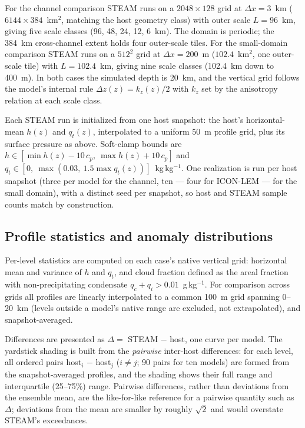 For the channel comparison STEAM runs on a $2048\times 128$ grid at
$\Delta x = 3$~km ($6144\times 384$~km$^2$, matching the host geometry
class) with outer scale $L = 96$~km, giving five scale classes (96, 48,
24, 12, 6~km). The domain is periodic; the 384~km cross-channel extent
holds four outer-scale tiles. For the small-domain comparison STEAM runs
on a $512^2$ grid at $\Delta x = 200$~m ($102.4$~km$^2$, one outer-scale
tile) with $L = 102.4$~km, giving nine scale classes (102.4~km down to
400~m). In both cases the simulated depth is 20~km, and the vertical
grid follows the model's internal rule
$\Delta z(z) = k_z(z)/2$ with $k_z$ set by the anisotropy relation at
each scale class.

Each STEAM run is initialized from one host snapshot: the host's
horizontal-mean $h(z)$ and $q_t(z)$, interpolated to a uniform 50~m
profile grid, plus its surface pressure as above. Soft-clamp bounds are
$h \in [\min h(z) - 10\,c_p,\ \max h(z) + 10\,c_p]$ and
$q_t \in [0,\ \max(0.03,\ 1.5 \max q_t(z))]$~kg\,kg$^{-1}$. One
realization is run per host snapshot (three per model for the channel,
ten --- four for ICON-LEM --- for the small domain), with a distinct seed
per snapshot, so host and STEAM sample counts match by construction.

\subsection{Profile statistics and anomaly distributions}
\label{sect:rcemip stats}

Per-level statistics are computed on each case's native vertical grid:
horizontal mean and variance of $h$ and $q_t$, and cloud fraction
defined as the areal fraction with non-precipitating condensate
$q_c + q_i > 0.01$~g\,kg$^{-1}$. For comparison across grids all
profiles are linearly interpolated to a common 100~m grid spanning
0--20~km (levels outside a model's native range are excluded, not
extrapolated), and snapshot-averaged.

Differences are presented as $\Delta = $ STEAM $-$ host, one curve per
model. The yardstick shading is built from the \emph{pairwise}
inter-host differences: for each level, all ordered pairs
host$_i$ $-$ host$_j$ ($i \neq j$; 90 pairs for ten models) are formed
from the snapshot-averaged profiles, and the shading shows their full
range and interquartile (25--75\%) range. Pairwise differences, rather
than deviations from the ensemble mean, are the like-for-like reference
for a pairwise quantity such as $\Delta$; deviations from the mean are
smaller by roughly $\sqrt{2}$ and would overstate STEAM's exceedances.

